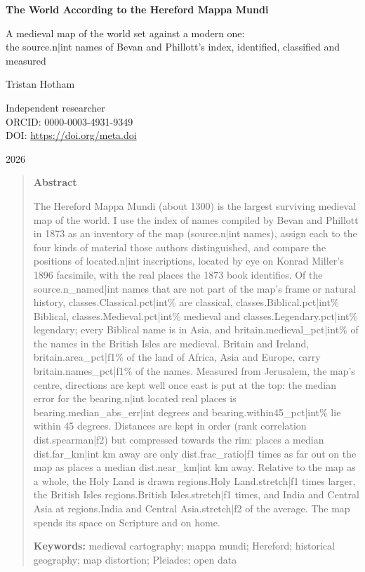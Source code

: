 \documentclass[11pt,a4paper]{article}
\begin{document}
\begin{center}
{\Large\bfseries The World According to the Hereford Mappa Mundi\par}
\vspace{0.4em}
{\large A medieval map of the world set against a modern one:\\the {{source.n|int}} names of Bevan and Phillott's index, identified, classified and measured\par}
\vspace{1.2em}
{\large Tristan Hotham\par}
\vspace{0.3em}
{\small Independent researcher\\
ORCID: 0000-0003-4931-9349\\
DOI: \href{https://doi.org/{{meta.doi}}}{https://doi.org/{{meta.doi}}}\par}
\vspace{0.8em}
2026
\end{center}

\begin{quote}
\small
\begin{center}\textbf{Abstract}\end{center}
The Hereford Mappa Mundi (about 1300) is the largest surviving medieval map of the world. I use the index of names compiled by Bevan and Phillott in 1873 as an inventory of the map ({{source.n|int}} names), assign each to the four kinds of material those authors distinguished, and compare the positions of {{located.n|int}} inscriptions, located by eye on Konrad Miller's 1896 facsimile, with the real places the 1873 book identifies. Of the {{source.n_named|int}} names that are not part of the map's frame or natural history, {{classes.Classical.pct|int}}\% are classical, {{classes.Biblical.pct|int}}\% Biblical, {{classes.Medieval.pct|int}}\% medieval and {{classes.Legendary.pct|int}}\% legendary; every Biblical name is in Asia, and {{britain.medieval_pct|int}}\% of the names in the British Isles are medieval. Britain and Ireland, {{britain.area_pct|f1}}\% of the land of Africa, Asia and Europe, carry {{britain.names_pct|f1}}\% of the names. Measured from Jerusalem, the map's centre, directions are kept well once east is put at the top: the median error for the {{bearing.n|int}} located real places is {{bearing.median_abs_err|int}} degrees and {{bearing.within45_pct|int}}\% lie within 45 degrees. Distances are kept in order (rank correlation {{dist.spearman|f2}}) but compressed towards the rim: places a median {{dist.far_km|int}} km away are only {{dist.frac_ratio|f1}} times as far out on the map as places a median {{dist.near_km|int}} km away. Relative to the map as a whole, the Holy Land is drawn {{regions.Holy Land.stretch|f1}} times larger, the British Isles {{regions.British Isles.stretch|f1}} times, and India and Central Asia at {{regions.India and Central Asia.stretch|f2}} of the average. The map spends its space on Scripture and on home.

\textbf{Keywords:} medieval cartography; mappa mundi; Hereford; historical geography; map distortion; Pleiades; open data
\end{quote}
\end{document}
